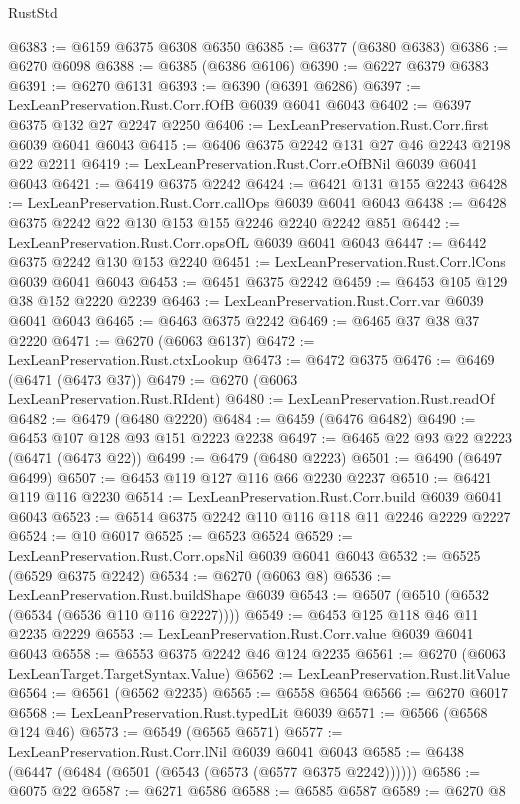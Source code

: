 \begin{lexlean}{RustStd}
\begin{coremodule}
{\begin{coremodule}
{{{{{{{{{{{{{{{{{{{{{{{{{{@6383 := @6159 @6375 @6308 @6350
@6385 := @6377 (@6380 @6383)
@6386 := @6270 @6098
@6388 := @6385 (@6386 @6106)
@6390 := @6227 @6379 @6383
@6391 := @6270 @6131
@6393 := @6390 (@6391 @6286)
@6397 := LexLeanPreservation.Rust.Corr.fOfB @6039 @6041 @6043
@6402 := @6397 @6375 @132 @27 @2247 @2250
@6406 := LexLeanPreservation.Rust.Corr.first @6039 @6041 @6043
@6415 := @6406 @6375 @2242 @131 @27 @46 @2243 @2198 @22 @2211
@6419 := LexLeanPreservation.Rust.Corr.eOfBNil @6039 @6041 @6043
@6421 := @6419 @6375 @2242
@6424 := @6421 @131 @155 @2243
@6428 := LexLeanPreservation.Rust.Corr.callOps @6039 @6041 @6043
@6438 := @6428 @6375 @2242 @22 @130 @153 @155 @2246 @2240 @2242 @851
@6442 := LexLeanPreservation.Rust.Corr.opsOfL @6039 @6041 @6043
@6447 := @6442 @6375 @2242 @130 @153 @2240
@6451 := LexLeanPreservation.Rust.Corr.lCons @6039 @6041 @6043
@6453 := @6451 @6375 @2242
@6459 := @6453 @105 @129 @38 @152 @2220 @2239
@6463 := LexLeanPreservation.Rust.Corr.var @6039 @6041 @6043
@6465 := @6463 @6375 @2242
@6469 := @6465 @37 @38 @37 @2220
@6471 := @6270 (@6063 @6137)
@6472 := LexLeanPreservation.Rust.ctxLookup
@6473 := @6472 @6375
@6476 := @6469 (@6471 (@6473 @37))
@6479 := @6270 (@6063 LexLeanPreservation.Rust.RIdent)
@6480 := LexLeanPreservation.Rust.readOf
@6482 := @6479 (@6480 @2220)
@6484 := @6459 (@6476 @6482)
@6490 := @6453 @107 @128 @93 @151 @2223 @2238
@6497 := @6465 @22 @93 @22 @2223 (@6471 (@6473 @22))
@6499 := @6479 (@6480 @2223)
@6501 := @6490 (@6497 @6499)
@6507 := @6453 @119 @127 @116 @66 @2230 @2237
@6510 := @6421 @119 @116 @2230
@6514 := LexLeanPreservation.Rust.Corr.build @6039 @6041 @6043
@6523 := @6514 @6375 @2242 @110 @116 @118 @11 @2246 @2229 @2227
@6524 := @10 @6017
@6525 := @6523 @6524
@6529 := LexLeanPreservation.Rust.Corr.opsNil @6039 @6041 @6043
@6532 := @6525 (@6529 @6375 @2242)
@6534 := @6270 (@6063 @8)
@6536 := LexLeanPreservation.Rust.buildShape @6039
@6543 := @6507 (@6510 (@6532 (@6534 (@6536 @110 @116 @2227))))
@6549 := @6453 @125 @118 @46 @11 @2235 @2229
@6553 := LexLeanPreservation.Rust.Corr.value @6039 @6041 @6043
@6558 := @6553 @6375 @2242 @46 @124 @2235
@6561 := @6270 (@6063 LexLeanTarget.TargetSyntax.Value)
@6562 := LexLeanPreservation.Rust.litValue
@6564 := @6561 (@6562 @2235)
@6565 := @6558 @6564
@6566 := @6270 @6017
@6568 := LexLeanPreservation.Rust.typedLit @6039
@6571 := @6566 (@6568 @124 @46)
@6573 := @6549 (@6565 @6571)
@6577 := LexLeanPreservation.Rust.Corr.lNil @6039 @6041 @6043
@6585 := @6438 (@6447 (@6484 (@6501 (@6543 (@6573 (@6577 @6375 @2242))))))
@6586 := @6075 @22
@6587 := @6271 @6586
@6588 := @6585 @6587
@6589 := @6270 @8
}}}}}}}}}}}}}}}}}}}}}}}}}}
\end{coremodule}}
\end{coremodule}
\end{lexlean}
